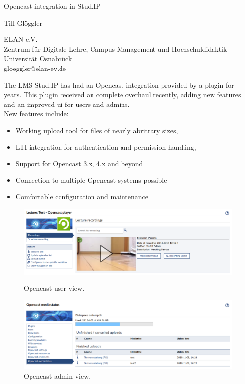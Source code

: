 \documentclass[a4paper]{article}
\begin{document}

\Large
 \begin{center}
     Opencast integration in Stud.IP\\

\hspace{10pt}

\large
Till Glöggler\\

\hspace{10pt}

\small
ELAN e.V.\\
Zentrum für Digitale Lehre, Campus Management
und Hochschuldidaktik\\
Universität Osnabrück\\
gloeggler@elan-ev.de\\


\end{center}

\hspace{10pt}

\normalsize
The LMS Stud.IP has had an Opencast integration provided by  a plugin for years. This plugin received
an complete overhaul recently, adding new features and an improved ui for users and admins.\\

New features include:
\begin{itemize}
    \item Working upload tool for files of nearly abritrary sizes,
    \item LTI integration for authentication and permission handling,
    \item Support for Opencast 3.x, 4.x and beyond
    \item Connection to multiple Opencast systems possible
    \item Comfortable configuration and maintenance
\end{itemize}

\begin{figure}[h!]
    \includegraphics[width=\linewidth]{opencast_user.png}
    \caption{Opencast user view.}

    \includegraphics[width=\linewidth]{opencast_admin.png}
    \caption{Opencast admin view.}
\end{figure}
\end{document}
